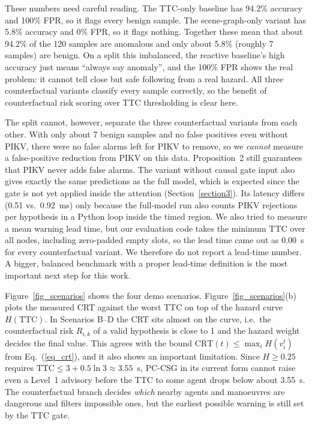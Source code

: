 \documentclass[preprint,12pt]{elsarticle}
\begin{document}
These numbers need careful reading. The TTC-only baseline has 94.2\% accuracy and 100\% FPR, so it flags every benign sample. The scene-graph-only variant has 5.8\% accuracy and 0\% FPR, so it flags nothing. Together these mean that about 94.2\% of the 120 samples are anomalous and only about 5.8\% (roughly 7 samples) are benign. On a split this imbalanced, the reactive baseline's high accuracy just means ``always say anomaly'', and the 100\% FPR shows the real problem: it cannot tell close but safe following from a real hazard. All three counterfactual variants classify every sample correctly, so the benefit of counterfactual risk scoring over TTC thresholding is clear here.

The split cannot, however, separate the three counterfactual variants from each other. With only about 7 benign samples and no false positives even without PIKV, there were no false alarms left for PIKV to remove, so we \emph{cannot} measure a false-positive reduction from PIKV on this data. Proposition~2 still guarantees that PIKV never adds false alarms. The variant without causal gate input also gives exactly the same predictions as the full model, which is expected since the gate is not yet applied inside the attention (Section~\ref{section3}). Its latency differs (0.51 vs.\ 0.92~ms) only because the full-model run also counts PIKV rejections per hypothesis in a Python loop inside the timed region. We also tried to measure a mean warning lead time, but our evaluation code takes the minimum TTC over all nodes, including zero-padded empty slots, so the lead time came out as 0.00~s for every counterfactual variant. We therefore do not report a lead-time number. A bigger, balanced benchmark with a proper lead-time definition is the most important next step for this work.

Figure~\ref{fig_scenarios} shows the four demo scenarios. Figure~\ref{fig_scenarios}(b) plots the measured CRT against the worst TTC on top of the hazard curve $H(\text{TTC})$. In Scenarios B--D the CRT sits almost on the curve, i.e.\ the counterfactual risk $R_{i,k}$ of a valid hypothesis is close to 1 and the hazard weight decides the final value. This agrees with the bound $\text{CRT}(t) \le \max_i H(v_i^t)$ from Eq.~(\ref{eq_crt}), and it also shows an important limitation. Since $H \ge 0.25$ requires $\text{TTC} \le 3 + 0.5 \ln 3 \approx 3.55$~s, PC-CSG in its current form cannot raise even a Level~1 advisory before the TTC to some agent drops below about 3.55~s. The counterfactual branch decides \emph{which} nearby agents and manoeuvres are dangerous and filters impossible ones, but the earliest possible warning is still set by the TTC gate.
\end{document}
